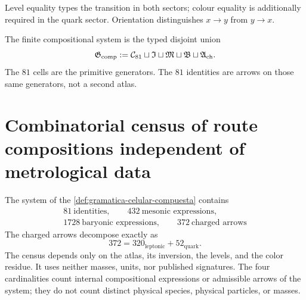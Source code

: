 Level equality types the transition in both sectors; colour equality is
additionally required in the quark sector. Orientation distinguishes \(x\to y\)
from \(y\to x\).

\begin{definition}
\label{def:gramatica-celular-compuesta}
The finite compositional system is the typed disjoint union
\[
 \mathfrak G_{\rm comp}
 :=
 \mathcal C_{81}
 \sqcup\mathfrak I
 \sqcup\mathfrak M
 \sqcup\mathfrak B
 \sqcup\mathfrak A_{\rm ch}.
\]
The \(81\) cells are the primitive generators. The \(81\) identities are
arrows on those same generators, not a second atlas.
\end{definition}

\section{Combinatorial census of route compositions independent of metrological data}
\label{sec:censo-composicional-rev6}

\begin{theorem}
\label{thm:censo-gramatica-composicional-rev6}
The system of the \cref{def:gramatica-celular-compuesta} contains
\[
 \boxed{\begin{gathered}
        81\ \text{identities},\qquad
        432\ \text{mesonic expressions},\\
        1728\ \text{baryonic expressions},\qquad
        372\ \text{charged arrows}
 \end{gathered}}
\]
The charged arrows decompose exactly as
\[
 372=320_{\text{leptonic}}+52_{\text{quark}}.
\]
The census depends only on the atlas, its inversion, the levels, and the
color residue. It uses neither masses, units, nor published signatures.
The four cardinalities count internal compositional expressions or admissible arrows
of the system; they do not count distinct physical species, physical particles,
or masses.
\end{theorem}

